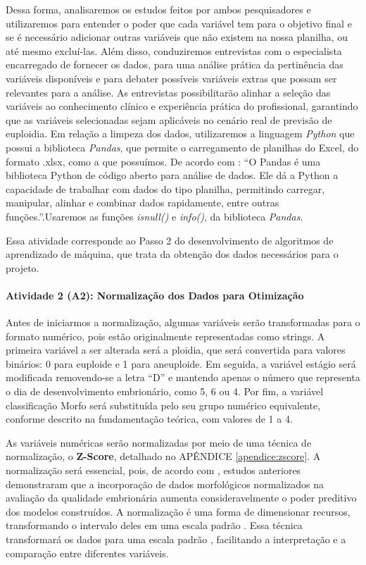 Dessa forma, analisaremos os estudos feitos por ambos pesquisadores e utilizaremos para entender o poder que cada variável tem para o objetivo final e se é necessário adicionar outras variáveis que não existem na nossa planilha, ou até mesmo excluí-las. Além disso, conduziremos entrevistas com o especialista encarregado de fornecer os dados, para uma análise prática da pertinência das variáveis disponíveis e para debater possíveis variáveis extras que possam ser relevantes para a análise. As entrevistas possibilitarão alinhar a seleção das variáveis ao conhecimento clínico e experiência prática do profissional, garantindo que as variáveis selecionadas sejam aplicáveis no cenário real de previsão de euploidia. Em relação a limpeza dos dados, utilizaremos a linguagem \textit{Python} que possui a biblioteca \textit{Pandas}, que permite o carregamento de planilhas do Excel, do formato .xlsx, como a que possuímos. De acordo com : “O Pandas é uma biblioteca Python de código aberto para análise de dados. Ele dá a Python a capacidade de trabalhar com dados do tipo planilha, permitindo carregar, manipular, alinhar e combinar dados rapidamente, entre outras funções.”.Usaremos as funções \textit{isnull()} e \textit{info()}, da biblioteca \textit{Pandas}. 

Essa atividade corresponde ao Passo 2 do desenvolvimento de algoritmos de aprendizado de máquina, que trata da obtenção dos dados necessários para o projeto.

\paragraph{\textbf{Atividade 2 (A2):} Normalização dos Dados para Otimização}

Antes de iniciarmos a normalização, algumas variáveis serão transformadas para o formato numérico, pois estão originalmente representadas como strings. A primeira variável a ser alterada será a ploidia, que será convertida para valores binários: 0 para euploide e 1 para aneuploide. Em seguida, a variável estágio será modificada removendo-se a letra “D” e mantendo apenas o número que representa o dia de desenvolvimento embrionário, como 5, 6 ou 4. Por fim, a variável classificação Morfo será substituída pelo seu grupo numérico equivalente, conforme descrito na fundamentação teórica, com valores de 1 a 4.

As variáveis numéricas serão normalizadas por meio de uma técnica de normalização, o \textbf{Z-Score}, detalhado no APÊNDICE \ref{apendice:zscore}. A normalização será essencial, pois, de acordo com , estudos anteriores demonstraram que a incorporação de dados morfológicos normalizados na avaliação da qualidade embrionária aumenta consideravelmente o poder preditivo dos modelos construídos. A normalização é uma forma de dimensionar recursos, transformando o intervalo deles em uma escala padrão \cite{jaiswal2024}. Essa técnica transformará os dados para uma escala padrão \cite{jaiswal2024}, facilitando a interpretação e a comparação entre diferentes variáveis.

